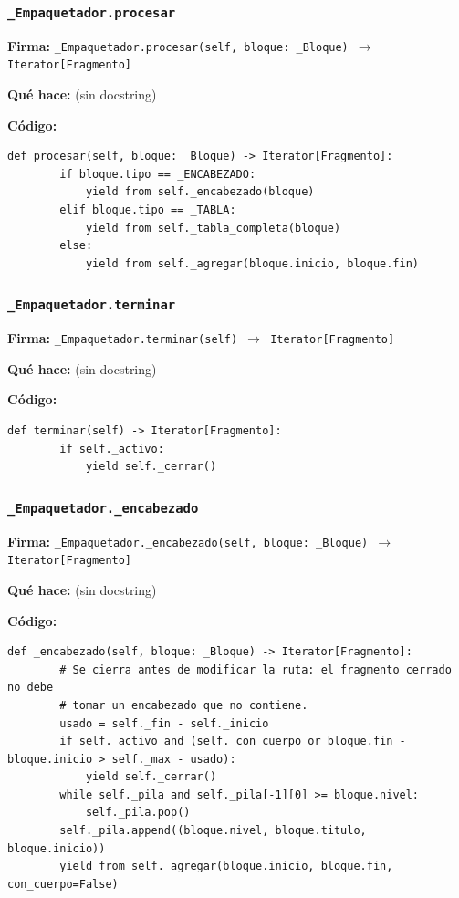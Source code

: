 \documentclass[11pt,a4paper]{article}
\begin{document}
\subsubsection*{\texttt{\_Empaquetador.procesar}}
\textbf{Firma:} \texttt{\_Empaquetador.procesar(self, bloque: \_Bloque) $\rightarrow$ Iterator[Fragmento]}

\textbf{Qué hace:} (sin docstring)

\textbf{Código:}
\begin{lstlisting}
def procesar(self, bloque: _Bloque) -> Iterator[Fragmento]:
        if bloque.tipo == _ENCABEZADO:
            yield from self._encabezado(bloque)
        elif bloque.tipo == _TABLA:
            yield from self._tabla_completa(bloque)
        else:
            yield from self._agregar(bloque.inicio, bloque.fin)
\end{lstlisting}

\subsubsection*{\texttt{\_Empaquetador.terminar}}
\textbf{Firma:} \texttt{\_Empaquetador.terminar(self) $\rightarrow$ Iterator[Fragmento]}

\textbf{Qué hace:} (sin docstring)

\textbf{Código:}
\begin{lstlisting}
def terminar(self) -> Iterator[Fragmento]:
        if self._activo:
            yield self._cerrar()
\end{lstlisting}

\subsubsection*{\texttt{\_Empaquetador.\_encabezado}}
\textbf{Firma:} \texttt{\_Empaquetador.\_encabezado(self, bloque: \_Bloque) $\rightarrow$ Iterator[Fragmento]}

\textbf{Qué hace:} (sin docstring)

\textbf{Código:}
\begin{lstlisting}
def _encabezado(self, bloque: _Bloque) -> Iterator[Fragmento]:
        # Se cierra antes de modificar la ruta: el fragmento cerrado no debe
        # tomar un encabezado que no contiene.
        usado = self._fin - self._inicio
        if self._activo and (self._con_cuerpo or bloque.fin - bloque.inicio > self._max - usado):
            yield self._cerrar()
        while self._pila and self._pila[-1][0] >= bloque.nivel:
            self._pila.pop()
        self._pila.append((bloque.nivel, bloque.titulo, bloque.inicio))
        yield from self._agregar(bloque.inicio, bloque.fin, con_cuerpo=False)
\end{lstlisting}
\end{document}
